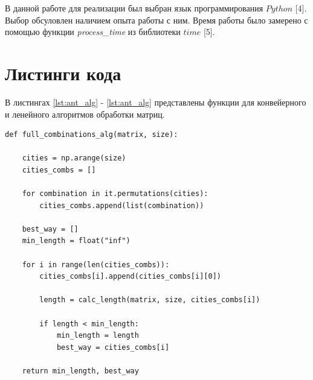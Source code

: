 \documentclass[a4paper,14pt, unknownkeysallowed]{extreport}
\begin{document}
В данной работе для реализации был выбран язык программирования $Python$ [4]. Выбор обсуловлен наличием опыта работы с ним. Время работы было замерено с помощью функции \textit{process\_time} из библиотеки $time$ [5].

\section{Листинги кода}

В листингах \ref{lst:ant_alg} - \ref{lst:ant_alg} представлены функции для конвейерного и ленейного алгоритмов обработки матриц.

\begin{center}
\captionsetup{justification=raggedright,singlelinecheck=off}
\begin{lstlisting}[label=lst:full_combinations_alg,caption=Алгоритм полного перебора]
def full_combinations_alg(matrix, size):

	cities = np.arange(size)
	cities_combs = []

	for combination in it.permutations(cities):
		cities_combs.append(list(combination))

	best_way = []
	min_length = float("inf")

	for i in range(len(cities_combs)):
		cities_combs[i].append(cities_combs[i][0])

		length = calc_length(matrix, size, cities_combs[i])

		if length < min_length:
			min_length = length
			best_way = cities_combs[i]

	return min_length, best_way
\end{lstlisting}
\end{center}	

\clearpage
\end{document}
